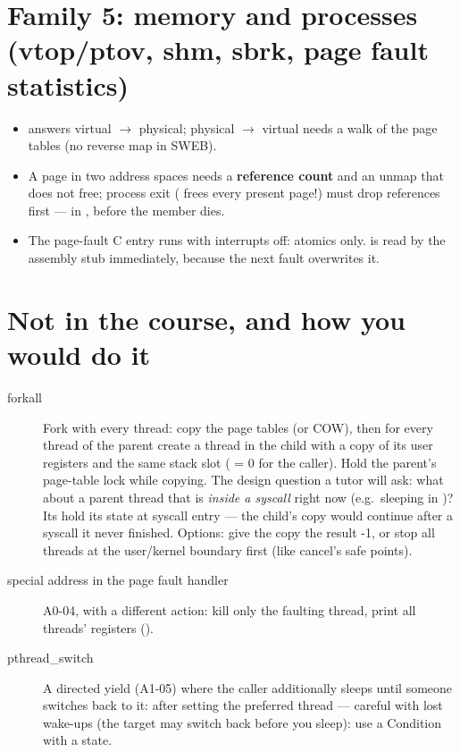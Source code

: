 \section{Family 5: memory and processes (vtop/ptov, shm, sbrk, page fault statistics)}

\begin{itemize}
\item {} answers virtual $\to$ physical; physical $\to$ virtual needs a walk of
  the page tables (no reverse map in SWEB).
\item A page in two address spaces needs a \textbf{reference count} and an unmap that does not free;
  process exit ( frees every present page!) must drop references
  first --- in , before the member  dies.
\item The page-fault C entry  runs with interrupts off: atomics
  only.  is read by the assembly stub immediately, because the next fault overwrites it.
\end{itemize}

\section{Not in the course, and how you would do it}

\begin{description}
\item[forkall] Fork with every thread: copy the page tables (or COW), then for every thread of the
  parent create a thread in the child with a copy of its user registers and the same stack slot
  ( = 0 for the caller). Hold the parent's page-table lock while copying. The design
  question a tutor will ask: what about a parent thread that is \emph{inside a syscall} right now
  (e.g.\ sleeping in )? Its  hold its state at syscall
  entry --- the child's copy would continue after a syscall it never finished. Options: give the copy
  the result -1, or stop all threads at the user/kernel boundary first (like cancel's safe points).
\item[special address in the page fault handler] A0-04, with a different action: kill only the
  faulting thread, print all threads' registers ().
\item[pthread\_switch] A directed yield (A1-05) where the caller additionally sleeps until someone
  switches back to it:  after setting the preferred thread --- careful
  with lost wake-ups (the target may switch back before you sleep): use a Condition with a state.
\end{description}
